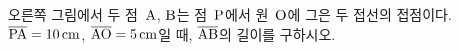 \noindent\begin{minipage}[t]{0.58\linewidth}\vspace{0pt}\raggedright 오른쪽 그림에서 두 점~$\mathrm{A}$, $\mathrm{B}$는 점~$\mathrm{P}$에서 원~$\mathrm{O}$에 그은 두 접선의 접점이다. $\overline{\mathrm{PA}}=10\,\mathrm{cm}$, $\overline{\mathrm{AO}}=5\,\mathrm{cm}$일 때, $\overline{\mathrm{AB}}$의 길이를 구하시오.\end{minipage}\hfill\begin{minipage}[t]{0.4\linewidth}\vspace{0pt}\centering \resizebox{\ifdim\width>\linewidth\linewidth\else\width\fi}{!}{}\end{minipage}\par
